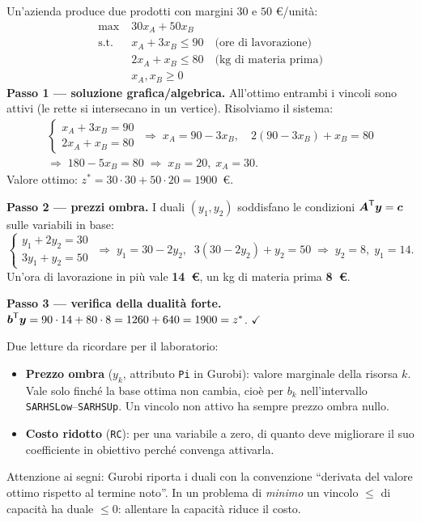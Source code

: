 \begin{esempio}
Un'azienda produce due prodotti con margini $30$ e $50$ \euro/unità:
\begin{align*}
\max\;& 30x_A + 50x_B \\
\text{s.t.}\;\; & x_A + 3x_B \le 90 \quad\text{(ore di lavorazione)}\\
& 2x_A + x_B \le 80 \quad\text{(kg di materia prima)}\\
& x_A, x_B \ge 0
\end{align*}
\textbf{Passo 1 — soluzione grafica/algebrica.} All'ottimo entrambi i vincoli sono attivi
(le rette si intersecano in un vertice). Risolviamo il sistema:
\begin{gather*}
\begin{cases} x_A + 3x_B = 90 \\ 2x_A + x_B = 80 \end{cases}
\;\Rightarrow\;
x_A = 90 - 3x_B,\quad 2(90 - 3x_B) + x_B = 80 \\
\Rightarrow\; 180 - 5x_B = 80
\;\Rightarrow\; x_B = 20,\; x_A = 30.
\end{gather*}
Valore ottimo: $z^* = 30\cdot 30 + 50 \cdot 20 = 1900$~\euro.

\textbf{Passo 2 — prezzi ombra.} I duali $(y_1, y_2)$ soddisfano le condizioni
$\boldsymbol{A}^{\mathsf T} \boldsymbol{y} = \boldsymbol{c}$ sulle variabili in base:
\[
\begin{cases} y_1 + 2y_2 = 30 \\ 3y_1 + y_2 = 50 \end{cases}
\;\Rightarrow\; y_1 = 30 - 2y_2,\;\; 3(30 - 2y_2) + y_2 = 50 \;\Rightarrow\;
y_2 = 8,\; y_1 = 14.
\]
Un'ora di lavorazione in più vale \textbf{14~\euro}, un kg di materia prima \textbf{8~\euro}.

\textbf{Passo 3 — verifica della dualità forte.}
$\boldsymbol{b}^{\mathsf T} \boldsymbol{y} = 90 \cdot 14 + 80 \cdot 8 = 1260 + 640 = 1900 = z^*$. \hfill$\checkmark$
\end{esempio}

\begin{spiegazione}
Due letture da ricordare per il laboratorio:
\begin{itemize}
  \item \textbf{Prezzo ombra} ($y_k$, attributo \texttt{Pi} in Gurobi): valore marginale
        della risorsa $k$. Vale solo finché la base ottima non cambia, cioè per
        $b_k$ nell'intervallo \texttt{SARHSLow}--\texttt{SARHSUp}. Un vincolo non attivo
        ha sempre prezzo ombra nullo.
  \item \textbf{Costo ridotto} (\texttt{RC}): per una variabile a zero, di quanto deve
        migliorare il suo coefficiente in obiettivo perché convenga attivarla.
\end{itemize}
Attenzione ai segni: Gurobi riporta i duali con la convenzione ``derivata del valore
ottimo rispetto al termine noto''. In un problema di \emph{minimo} un vincolo
$\le$ di capacità ha duale $\le 0$: allentare la capacità riduce il costo.
\end{spiegazione}

